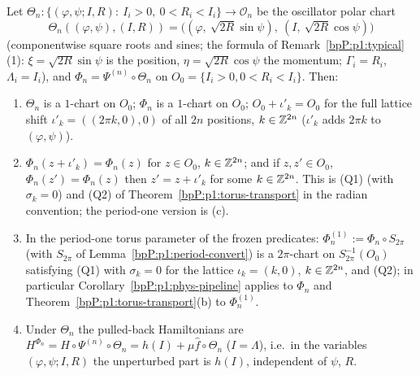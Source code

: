 \begin{lemma}\label{bpP:p7:lattice}
Let $\Theta_n:\{(\varphi,\psi;I,R):\ I_i>0,\ 0<R_i<I_i\}\to\mathcal O_n$ be the oscillator polar chart
\[\Theta_n((\varphi,\psi),(I,R))=\bigl((\varphi,\ \sqrt{2R}\sin\psi),\ (I,\ \sqrt{2R}\cos\psi)\bigr)\]
(componentwise square roots and sines; the formula of Remark~\ref{bpP:p1:typical}(1): $\xi=\sqrt{2R}\sin\psi$ is the position, $\eta=\sqrt{2R}\cos\psi$ the momentum; $\Gamma_i=R_i$, $\Lambda_i=I_i$), and $\Phi_n=\Psi^{(n)}\circ\Theta_n$ on $O_0=\{I_i>0,0<R_i<I_i\}$. Then:
\begin{enumerate}[label=(\alph*)]
\item $\Theta_n$ is a $1$-chart on $O_0$; $\Phi_n$ is a $1$-chart on $O_0$; $O_0+\iota'_k=O_0$ for the full lattice shift $\iota'_k=((2\pi k,0),0)$ of all $2n$ positions, $k\in\mathbb{Z}^{2n}$ ($\iota'_k$ adds $2\pi k$ to $(\varphi,\psi)$).
\item $\Phi_n(z+\iota'_k)=\Phi_n(z)$ for $z\in O_0$, $k\in\mathbb{Z}^{2n}$; and if $z,z'\in O_0$, $\Phi_n(z')=\Phi_n(z)$ then $z'=z+\iota'_k$ for some $k\in\mathbb{Z}^{2n}$. This is (Q1) (with $\sigma_k=0$) and (Q2) of Theorem~\ref{bpP:p1:torus-transport} in the radian convention; the period-one version is (c).
\item In the period-one torus parameter of the frozen predicates: $\Phi_n^{(1)}:=\Phi_n\circ S_{2\pi}$ (with $S_{2\pi}$ of Lemma~\ref{bpP:p1:period-convert}) is a $2\pi$-chart on $S_{2\pi}^{-1}(O_0)$ satisfying (Q1) with $\sigma_k=0$ for the lattice $\iota_k=(k,0)$, $k\in\mathbb{Z}^{2n}$, and (Q2); in particular Corollary~\ref{bpP:p1:phys-pipeline} applies to $\Phi_n$ and Theorem~\ref{bpP:p1:torus-transport}(b) to $\Phi_n^{(1)}$.
\item Under $\Theta_n$ the pulled-back Hamiltonians are $H^{\Phi_n}=H\circ\Psi^{(n)}\circ\Theta_n=h(I)+\mu\hat f\circ\Theta_n$ ($I=\Lambda$), i.e.\ in the variables $(\varphi,\psi;I,R)$ the unperturbed part is $h(I)$, independent of $\psi$, $R$.
\end{enumerate}
\end{lemma}
